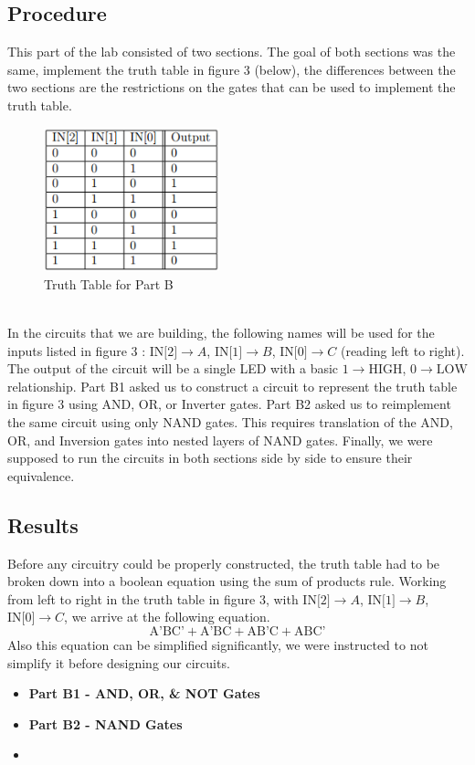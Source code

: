 \documentclass[a4paper,11pt]{article}
\begin{document}
\subsection{Procedure}
This part of the lab consisted of two sections. The goal of both sections was the same, implement the truth table in figure 3 (below), the differences between the two sections are the restrictions on the gates that can be used to implement the truth table.  \\ 
\begin{figure}[h!]
   \centering
     \includegraphics[width=2in]{PartBTT}
   \caption{Truth Table for Part B}
   \label{fig:map}
\end{figure} \\
In the circuits that we are building, the following names will be used for the inputs listed in figure 3 : $\text{IN[2]} \to A$, $\text{IN[1]} \to B$, $\text{IN[0]} \to C$ (reading left to right). The output of the circuit will be a single LED with a basic $1 \to \text{HIGH}$, $0 \to \text{LOW}$ relationship. Part B1 asked us to construct a circuit to represent the truth table in figure 3 using AND, OR, or Inverter gates. Part B2 asked us to reimplement the same circuit using only NAND gates. This requires translation of the AND, OR, and Inversion gates into nested layers of NAND gates. Finally, we were supposed to run the circuits in both sections side by side to ensure their equivalence. 

\subsection{Results}
Before any circuitry could be properly constructed, the truth table had to be broken down into a boolean equation using the sum of products rule. Working from left to right in the truth table in figure 3, with $\text{IN[2]} \to A$, $\text{IN[1]} \to B$, $\text{IN[0]} \to C$, we arrive at the following equation.
\[ \text{A'BC'} + \text{A'BC} + \text{AB'C} + \text{ABC'} \]
Also this equation can be simplified significantly, we were instructed to not simplify it before designing our circuits. 
\begin{itemize} 
\item \textbf{Part B1 - AND, OR, \& NOT Gates}
\item \textbf{Part B2 - NAND Gates}
\item
\end{itemize}
\end{document}
